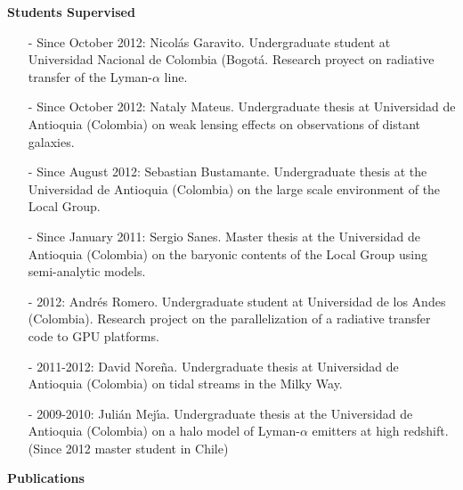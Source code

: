 \documentclass[9pt]{article}
\begin{document}
{\bf Students Supervised}
\begin{itemize}

\item[-] Since October 2012: Nicol\'as Garavito. Undergraduate student at Universidad Nacional de Colombia (Bogot\'a. Research proyect on radiative transfer of the Lyman-$\alpha$ line.
\item[-] Since October 2012: Nataly Mateus. Undergraduate thesis at Universidad de Antioquia (Colombia) on weak lensing effects on observations of distant galaxies.
\item[-] Since August 2012: Sebastian Bustamante. Undergraduate thesis at the Universidad de Antioquia (Colombia) on the large scale environment of the Local Group.
\item[-] Since January 2011: Sergio Sanes. Master thesis at the Universidad de Antioquia (Colombia) on the baryonic contents of the Local Group using semi-analytic models.
\item[-] 2012: Andr\'es Romero. Undergraduate student at Universidad de los Andes (Colombia). Research project on the parallelization of a radiative transfer code to GPU platforms.
\item[-]2011-2012: David Nore\~na. Undergraduate thesis at Universidad de Antioquia (Colombia) on tidal streams in the Milky Way.
\item[-]2009-2010: Juli\'an Mej\'{\i}a. Undergraduate thesis at the Universidad de Antioquia (Colombia) on a halo model of Lyman-$\alpha$ emitters at high redshift. (Since 2012 master student in Chile)
\end{itemize}

\newpage
{\bf Publications}\\
\end{document}
